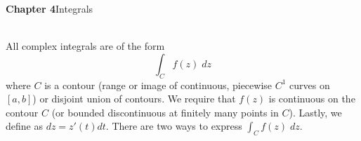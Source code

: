\vspace{2ex}
{\bf Chapter 4}\hspace{2ex}Integrals
\\\\
\begin{defi}
All complex integrals are of the form
\[\int _{C}f(z)\;dz\]
where $C$ is a contour (range or image of continuous, piecewise $C^{1}$ curves on $[a,b]$) or disjoint union of contours. We require that $f(z)$ is continuous on the contour $C$ (or bounded discontinuous at finitely many points in $C$). Lastly, we define as  $dz=z'(t)dt$. There are two ways to express $\int _{C}f(z)\;dz$.
\end{defi}
\vspace{2ex}


